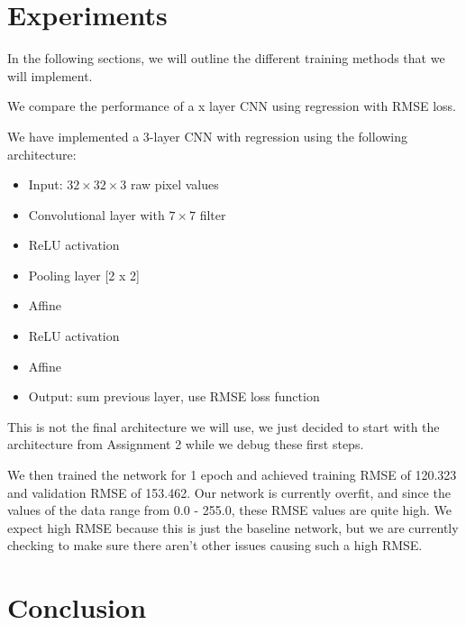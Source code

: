 \documentclass[10pt,twocolumn,letterpaper]{article}
\begin{document}
\section{Experiments} 
In the following sections, we will outline the different training methods that we will implement. 

We compare the performance of a x layer CNN using regression with RMSE loss.


We have implemented a 3-layer CNN with regression using the following architecture: 

\begin{itemize}
\item Input: $32  \times  32  \times  3$ raw pixel values
\item Convolutional layer with $7  \times  7$ filter
\item ReLU activation
\item Pooling layer [2 x 2]
\item Affine
\item ReLU activation
\item Affine
\item Output: sum previous layer, use RMSE loss function
\end{itemize}

This is not the final architecture we will use, we just decided to start with the architecture from Assignment 2 while we debug these first steps. 

We then trained the network for 1 epoch and achieved training RMSE of 120.323 and validation RMSE of 153.462. Our network is currently overfit, and since the values of the data range from 0.0 - 255.0, these RMSE values are quite high. We expect high RMSE because this is just the baseline network, but we are currently checking to make sure there aren't other issues causing such a high RMSE.

\section{Conclusion}
\end{document}
